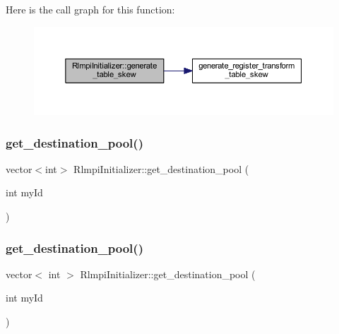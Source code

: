 Here is the call graph for this function\+:
\nopagebreak
\begin{figure}[H]
\begin{center}
\leavevmode
\includegraphics[width=350pt]{classRlmpiInitializer_a2a7ecc728bf06dc067eff4ee840c75d5_cgraph}
\end{center}
\end{figure}
\mbox{\label{classRlmpiInitializer_a1ce96c82b067ef1f1af1afeca286e0f6}} 
\subsubsection{\texorpdfstring{get\_destination\_pool()}{get\_destination\_pool()}\hspace{0.1cm}{\footnotesize\ttfamily [1/2]}}
{\footnotesize\ttfamily vector$<$int$>$ Rlmpi\+Initializer\+::get\+\_\+destination\+\_\+pool (\begin{DoxyParamCaption}\item[{int}]{my\+Id }\end{DoxyParamCaption})\hspace{0.3cm}{\ttfamily [protected]}}

\mbox{\label{classRlmpiInitializer_a4b50739703f39a77d03b223ac5f79cf6}} 
\subsubsection{\texorpdfstring{get\_destination\_pool()}{get\_destination\_pool()}\hspace{0.1cm}{\footnotesize\ttfamily [2/2]}}
{\footnotesize\ttfamily vector$<$ int $>$ Rlmpi\+Initializer\+::get\+\_\+destination\+\_\+pool (\begin{DoxyParamCaption}\item[{int}]{my\+Id }\end{DoxyParamCaption})\hspace{0.3cm}{\ttfamily [protected]}}

